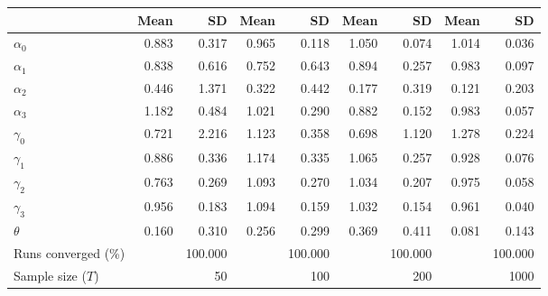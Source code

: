
\begin{tabular}[t]{lrrrrrrrr}
\toprule
  & Mean & SD & Mean  & SD  & Mean   & SD   & Mean    & SD   \\
\midrule
$\alpha_{0}$ & 0.883 & 0.317 & 0.965 & 0.118 & 1.050 & 0.074 & 1.014 & 0.036\\
$\alpha_{1}$ & 0.838 & 0.616 & 0.752 & 0.643 & 0.894 & 0.257 & 0.983 & 0.097\\
$\alpha_{2}$ & 0.446 & 1.371 & 0.322 & 0.442 & 0.177 & 0.319 & 0.121 & 0.203\\
$\alpha_{3}$ & 1.182 & 0.484 & 1.021 & 0.290 & 0.882 & 0.152 & 0.983 & 0.057\\
$\gamma_{0}$ & 0.721 & 2.216 & 1.123 & 0.358 & 0.698 & 1.120 & 1.278 & 0.224\\
$\gamma_{1}$ & 0.886 & 0.336 & 1.174 & 0.335 & 1.065 & 0.257 & 0.928 & 0.076\\
$\gamma_{2}$ & 0.763 & 0.269 & 1.093 & 0.270 & 1.034 & 0.207 & 0.975 & 0.058\\
$\gamma_{3}$ & 0.956 & 0.183 & 1.094 & 0.159 & 1.032 & 0.154 & 0.961 & 0.040\\
$\theta$ & 0.160 & 0.310 & 0.256 & 0.299 & 0.369 & 0.411 & 0.081 & 0.143\\
Runs converged (\%) &  & 100.000 &  & 100.000 &  & 100.000 &  & 100.000\\
Sample size ($T$) &  & 50 &  & 100 &  & 200 &  & 1000\\
\bottomrule
\end{tabular}
